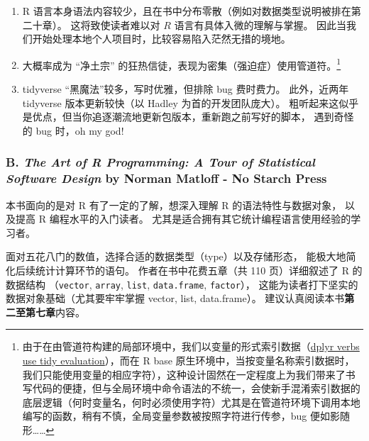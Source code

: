 \documentclass[11pt,hyperref]{ctexart}
\begin{document}
\begin{enumerate}
\def\labelenumi{\arabic{enumi}.}
\item
  R
  语言本身语法内容较少，且在书中分布零散（例如对数据类型说明被排在第二十章）。
  这将致使读者难以对 \(R\) 语言有具体入微的理解与掌握。
  因此当我们开始处理本地个人项目时，比较容易陷入茫然无措的境地。
\item
  大概率成为 ``净土宗''
  的狂热信徒，表现为密集（强迫症）使用管道符。\footnote{由于在由管道符构建的局部环境中，我们以变量的形式索引数据（\href{https://cran.r-project.org/web/packages/dplyr/vignettes/programming.html}{dplyr
    verbs use tidy evaluation}），而在 R base
    原生环境中，当按变量名称索引数据时，我们只能使用变量的相应字符），这种设计固然在一定程度上为我们带来了书写代码的便捷，但与全局环境中命令语法的不统一，会使新手混淆索引数据的底层逻辑（何时变量名，何时必须使用字符）尤其是在管道符环境下调用本地编写的函数，稍有不慎，全局变量参数被按照字符进行传参，bug
    便如影随形\ldots\ldots{}}
\item
  tidyverse ``黑魔法''较多，写时优雅，但排除 bug 费时费力。 此外，近两年
  tidyverse 版本更新较快（以 Hadley 为首的开发团队庞大）。
  粗听起来这似乎是优点，但当你追逐潮流地更新包版本，重新跑之前写好的脚本，
  遇到奇怪的 bug 时，oh my god!
\end{enumerate}

\hypertarget{b.-the-art-of-r-programming-a-tour-of-statistical-software-design-by-norman-matloff---no-starch-press}{%
\subsubsection{\texorpdfstring{B. \emph{The Art of R Programming: A Tour
of Statistical Software Design} by Norman Matloff - No Starch
Press}{B. The Art of R Programming: A Tour of Statistical Software Design by Norman Matloff - No Starch Press}}\label{b.-the-art-of-r-programming-a-tour-of-statistical-software-design-by-norman-matloff---no-starch-press}}

本书面向的是对 R 有了一定的了解，想深入理解 R 的语法特性与数据对象，
以及提高 R 编程水平的入门读者。
尤其是适合拥有其它统计编程语言使用经验的学习者。

面对五花八门的数值，选择合适的数据类型（type）以及存储形态，
能极大地简化后续统计计算环节的语句。 作者在书中花费五章（共 110
页）详细叙述了 R 的数据结构 （\texttt{vector}, \texttt{array},
\texttt{list}, \texttt{data.frame}, \texttt{factor}），
这能为读者打下坚实的数据对象基础（尤其要牢牢掌握 vector, list,
data.frame）。 建议认真阅读本书\textbf{第二至第七章}内容。
\end{document}
